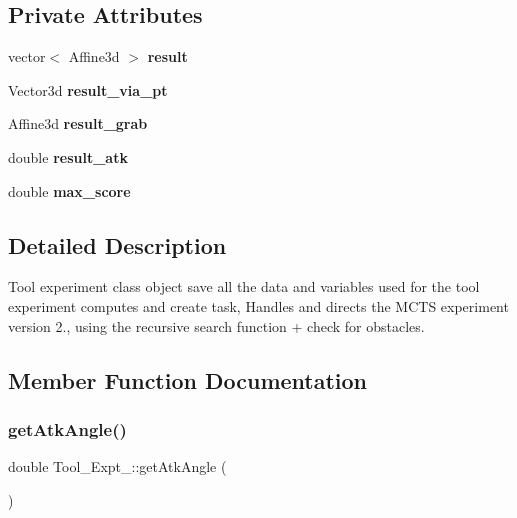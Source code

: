 \subsection*{Private Attributes}
\begin{DoxyCompactItemize}
\item 
\mbox{\label{classTool__Expt__2_ab85791e360a8688ac867a69f30263e29}} 
vector$<$ Affine3d $>$ {\bfseries result}
\item 
\mbox{\label{classTool__Expt__2_a7c70ddc3710ce4386d14de1626b69ad7}} 
Vector3d {\bfseries result\+\_\+via\+\_\+pt}
\item 
\mbox{\label{classTool__Expt__2_ada099fb22208cf179979d3edda16c669}} 
Affine3d {\bfseries result\+\_\+grab}
\item 
\mbox{\label{classTool__Expt__2_a1047fce015dcb3a94549eb24955d15f5}} 
double {\bfseries result\+\_\+atk}
\item 
\mbox{\label{classTool__Expt__2_a5ded0c8a48fea429b07cfafc1dbe4ca8}} 
double {\bfseries max\+\_\+score}
\end{DoxyCompactItemize}


\subsection{Detailed Description}
Tool experiment class object save all the data and variables used for the tool experiment computes and create task, Handles and directs the M\+C\+TS experiment version 2., using the recursive search function + check for obstacles. 

\subsection{Member Function Documentation}
\mbox{\label{classTool__Expt__2_a30ce22966534df289b16a55cd8a1636f}} 
\subsubsection{\texorpdfstring{get\+Atk\+Angle()}{getAtkAngle()}}
{\footnotesize\ttfamily double Tool\+\_\+\+Expt\+\_\+::get\+Atk\+Angle (\begin{DoxyParamCaption}{ }\end{DoxyParamCaption})\hspace{0.3cm}{\ttfamily [inline]}}



